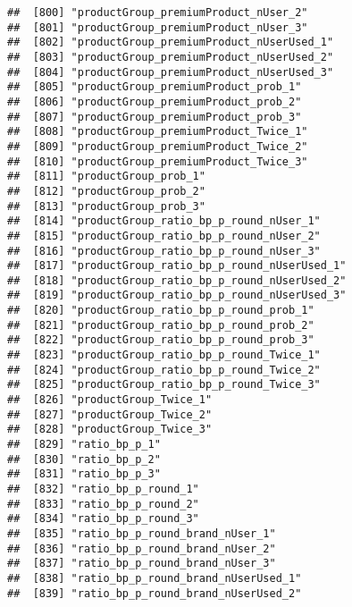 \documentclass[10pt]{report}
\begin{document}
\begin{verbatim}
##  [800] "productGroup_premiumProduct_nUser_2"                  
##  [801] "productGroup_premiumProduct_nUser_3"                  
##  [802] "productGroup_premiumProduct_nUserUsed_1"              
##  [803] "productGroup_premiumProduct_nUserUsed_2"              
##  [804] "productGroup_premiumProduct_nUserUsed_3"              
##  [805] "productGroup_premiumProduct_prob_1"                   
##  [806] "productGroup_premiumProduct_prob_2"                   
##  [807] "productGroup_premiumProduct_prob_3"                   
##  [808] "productGroup_premiumProduct_Twice_1"                  
##  [809] "productGroup_premiumProduct_Twice_2"                  
##  [810] "productGroup_premiumProduct_Twice_3"                  
##  [811] "productGroup_prob_1"                                  
##  [812] "productGroup_prob_2"                                  
##  [813] "productGroup_prob_3"                                  
##  [814] "productGroup_ratio_bp_p_round_nUser_1"                
##  [815] "productGroup_ratio_bp_p_round_nUser_2"                
##  [816] "productGroup_ratio_bp_p_round_nUser_3"                
##  [817] "productGroup_ratio_bp_p_round_nUserUsed_1"            
##  [818] "productGroup_ratio_bp_p_round_nUserUsed_2"            
##  [819] "productGroup_ratio_bp_p_round_nUserUsed_3"            
##  [820] "productGroup_ratio_bp_p_round_prob_1"                 
##  [821] "productGroup_ratio_bp_p_round_prob_2"                 
##  [822] "productGroup_ratio_bp_p_round_prob_3"                 
##  [823] "productGroup_ratio_bp_p_round_Twice_1"                
##  [824] "productGroup_ratio_bp_p_round_Twice_2"                
##  [825] "productGroup_ratio_bp_p_round_Twice_3"                
##  [826] "productGroup_Twice_1"                                 
##  [827] "productGroup_Twice_2"                                 
##  [828] "productGroup_Twice_3"                                 
##  [829] "ratio_bp_p_1"                                         
##  [830] "ratio_bp_p_2"                                         
##  [831] "ratio_bp_p_3"                                         
##  [832] "ratio_bp_p_round_1"                                   
##  [833] "ratio_bp_p_round_2"                                   
##  [834] "ratio_bp_p_round_3"                                   
##  [835] "ratio_bp_p_round_brand_nUser_1"                       
##  [836] "ratio_bp_p_round_brand_nUser_2"                       
##  [837] "ratio_bp_p_round_brand_nUser_3"                       
##  [838] "ratio_bp_p_round_brand_nUserUsed_1"                   
##  [839] "ratio_bp_p_round_brand_nUserUsed_2"                   

\end{verbatim}
\end{document}
